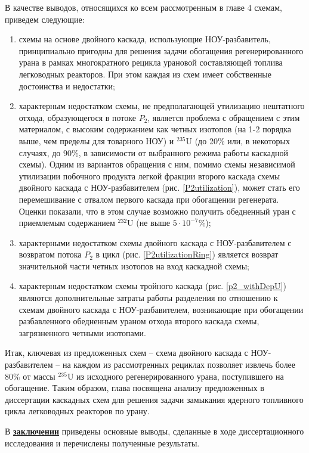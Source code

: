 В качестве выводов, относящихся ко всем рассмотренным в главе 4 схемам, приведем следующие:
\begin{enumerate}
    \item схемы на основе двойного каскада, использующие НОУ-разбавитель, принципиально пригодны для решения задачи обогащения регенерированного урана в рамках многократного рецикла урановой составляющей топлива легководных реакторов. При этом каждая из схем имеет собственные достоинства и недостатки;
    \item характерным недостатком схемы, не предполагающей утилизацию нештатного отхода, образующегося в потоке $P_2$, является проблема с обращением с этим материалом, с высоким содержанием как четных изотопов (на 1-2 порядка выше, чем пределы для товарного НОУ) и $^{235}$U (до 20\% или, в некоторых случаях, до 90\%, в зависимости от выбранного режима работы каскадной схемы). Одним из вариантов обращения с ним, помимо схемы независимой утилизации побочного продукта легкой фракции второго каскада схемы двойного каскада с НОУ-разбавителем (рис. \ref{P2utilization}), может стать его перемешивание с отвалом первого каскада при обогащении регенерата. Оценки показали, что в этом случае возможно получить обедненный уран с приемлемым содержанием $^{232}$U (не выше $5\cdot10^{-7}$\%);
    \item характерными недостатком схемы двойного каскада с НОУ-разбавителем с возвратом потока $P_2$ в цикл (рис. \ref{P2utilizationRing}) является возврат значительной части четных изотопов на вход каскадной схемы;
    \item характерным недостатком схемы тройного каскада (рис. \ref{p2_withDepU}) являются дополнительные затраты работы разделения по отношению к схемам двойного каскада с НОУ-разбавителем, возникающие при обогащении разбавленного обедненным ураном отхода второго каскада схемы, загрязненного четными изотопами.
  \end{enumerate}

Итак, ключевая из предложенных схем -- схема двойного каскада с НОУ-разбавителем -- на каждом из рассмотренных рециклах позволяет извлечь более 80\% от массы $^{235}$U из исходного регенерированного урана, поступившего на обогащение.
Таким образом, глава посвящена анализу предложенных в диссертации каскадных схем для решения задачи замыкания ядерного топливного цикла легководных реакторов по урану.

В \underline{\textbf{заключении}} приведены основные выводы, сделанные в ходе диссертационного исследования и перечислены полученные результаты.

